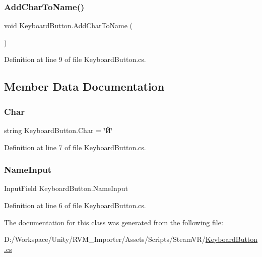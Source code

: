 \subsubsection{\texorpdfstring{AddCharToName()}{AddCharToName()}}
{\footnotesize\ttfamily void Keyboard\+Button.\+Add\+Char\+To\+Name (\begin{DoxyParamCaption}{ }\end{DoxyParamCaption})}



Definition at line 9 of file Keyboard\+Button.\+cs.



\subsection{Member Data Documentation}
\mbox{\label{class_keyboard_button_abca77d5a33fd544ec832c16d3970a7ff}} 
\subsubsection{\texorpdfstring{Char}{Char}}
{\footnotesize\ttfamily string Keyboard\+Button.\+Char = \char`\"{}Й\char`\"{}}



Definition at line 7 of file Keyboard\+Button.\+cs.

\mbox{\label{class_keyboard_button_a8d576d016d62d49fa39230fdd77c121b}} 
\subsubsection{\texorpdfstring{NameInput}{NameInput}}
{\footnotesize\ttfamily Input\+Field Keyboard\+Button.\+Name\+Input}



Definition at line 6 of file Keyboard\+Button.\+cs.



The documentation for this class was generated from the following file\+:\begin{DoxyCompactItemize}
\item 
D\+:/\+Workspace/\+Unity/\+R\+V\+M\+\_\+\+Importer/\+Assets/\+Scripts/\+Steam\+V\+R/\mbox{\hyperlink{_keyboard_button_8cs}{Keyboard\+Button.\+cs}}\end{DoxyCompactItemize}
